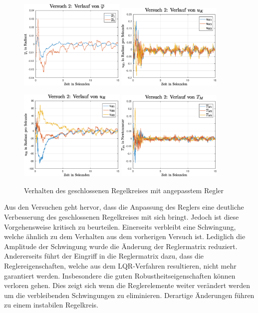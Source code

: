\begin{figure}[h!]
\centering
\includegraphics[width=0.45\textwidth]{img/exp2_phi.eps}
\includegraphics[width=0.45\textwidth]{img/exp2_uk.eps}
\vspace{0.5cm}

\includegraphics[width=0.45\textwidth]{img/exp2_ur.eps}
\includegraphics[width=0.45\textwidth]{img/exp2_tm.eps}
\caption{Verhalten des geschlossenen Regelkreises mit angepasstem Regler}
\end{figure}
Aus den Versuchen geht hervor, dass die Anpassung des Reglers eine deutliche Verbesserung des geschlossenen Regelkreises mit sich bringt. Jedoch ist diese Vorgehensweise kritisch zu beurteilen. Einerseits verbleibt eine Schwingung, welche ähnlich zu dem Verhalten aus dem vorherigen Versuch ist. Lediglich die Amplitude der Schwingung wurde die Änderung der Reglermatrix reduziert. Andererseits führt der Eingriff in die Reglermatrix dazu, dass die Reglereigenschaften, welche aus dem LQR-Verfahren resultieren, nicht mehr garantiert werden. Insbesondere die guten Robustheitseigenschaften können verloren gehen. Dies zeigt sich wenn die Reglerelemente weiter verändert werden um die verbleibenden Schwingungen zu eliminieren. Derartige Änderungen führen zu einem instabilen Regelkreis.